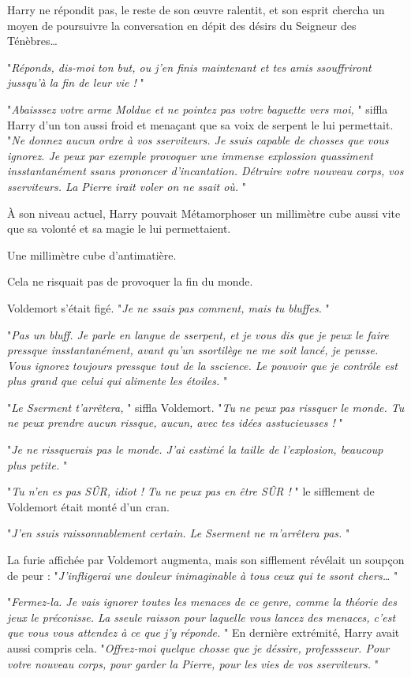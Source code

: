 Harry ne répondit pas, le reste de son œuvre ralentit, et son esprit chercha un moyen de poursuivre la conversation en dépit des désirs du Seigneur des Ténèbres…

"\emph{Réponds, dis-moi ton but, ou j'en finis maintenant et tes amis ssouffriront jussqu'à la fin de leur vie !} "

"\emph{Abaisssez votre arme Moldue et ne pointez pas votre baguette vers moi,} " siffla Harry d'un ton aussi froid et menaçant que sa voix de serpent le lui permettait. "\emph{Ne donnez aucun ordre à vos sserviteurs. Je ssuis capable de chosses que vous ignorez. Je peux par exemple provoquer une immense explossion quassiment insstantanément ssans prononcer d'incantation. Détruire votre nouveau corps, vos sserviteurs. La Pierre irait voler on ne ssait où.} "

À son niveau actuel, Harry pouvait Métamorphoser un millimètre cube aussi vite que sa volonté et sa magie le lui permettaient.

Une millimètre cube d'antimatière.

Cela ne risquait pas de provoquer la fin du monde.

Voldemort s'était figé. "\emph{Je ne ssais pas comment, mais tu bluffes.} "

"\emph{Pas un bluff. Je parle en langue de sserpent, et je vous dis que je peux le faire pressque insstantanément, avant qu'un ssortilège ne me soit lancé, je pensse. Vous ignorez toujours pressque tout de la sscience. Le pouvoir que je contrôle est plus grand que celui qui alimente les étoiles.} "

"\emph{Le Sserment t'arrêtera,} " siffla Voldemort. "\emph{Tu ne peux pas rissquer le monde. Tu ne peux prendre aucun rissque, aucun, avec tes idées asstucieusses !} "

"\emph{Je ne rissquerais pas le monde. J'ai esstimé la taille de l'explosion, beaucoup plus petite.} "

"\emph{Tu n'en es pas SÛR, idiot ! Tu ne peux pas en être SÛR !} " le sifflement de Voldemort était monté d'un cran.

"\emph{J'en ssuis raissonnablement certain. Le Sserment ne m'arrêtera pas.} "

La furie affichée par Voldemort augmenta, mais son sifflement révélait un soupçon de peur : "\emph{J'infligerai une douleur inimaginable à tous ceux qui te ssont chers…} "

"\emph{Fermez-la. Je vais ignorer toutes les menaces de ce genre, comme la théorie des jeux le préconisse. La sseule raisson pour laquelle vous lancez des menaces, c'est que vous vous attendez à ce que j'y réponde.} " En dernière extrémité, Harry avait aussi compris cela. "\emph{Offrez-moi quelque chosse que je déssire, professseur. Pour votre nouveau corps, pour garder la Pierre, pour les vies de vos sserviteurs.} "

